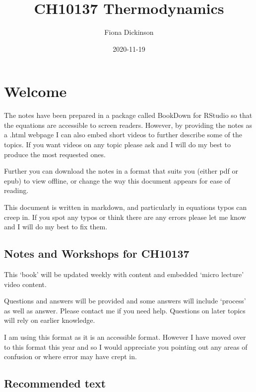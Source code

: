 \documentclass[
]{book}
\title{CH10137 Thermodynamics}
\author{Fiona Dickinson}
\date{2020-11-19}
\begin{document}
\maketitle

{
\setcounter{tocdepth}{1}
\tableofcontents
}
\hypertarget{welcome}{%
\chapter*{Welcome}\label{welcome}}

The notes have been prepared in a package called BookDown for RStudio so that the equations are accessible to screen readers. However, by providing the notes as a .html webpage I can also embed short videos to further describe some of the topics. If you want videos on any topic please ask and I will do my best to produce the most requested ones.

Further you can download the notes in a format that suits you (either pdf or epub) to view offline, or change the way this document appears for ease of reading.

This document is written in markdown, and particularly in equations typos can creep in. If you spot any typos or think there are any errors please let me know and I will do my best to fix them.

\hypertarget{notes-and-workshops-for-ch10137}{%
\section*{Notes and Workshops for CH10137}\label{notes-and-workshops-for-ch10137}}

This `book' will be updated weekly with content and embedded `micro lecture' video content.

Questions and answers will be provided and some answers will include `process' as well as answer. Please contact me if you need help. Questions on later topics will rely on earlier knowledge.

I am using this format as it is an accessible format. However I have moved over to this format this year and so I would appreciate you pointing out any areas of confusion or where error may have crept in.

\hypertarget{recommended-text}{%
\section*{Recommended text}\label{recommended-text}}
\end{document}
